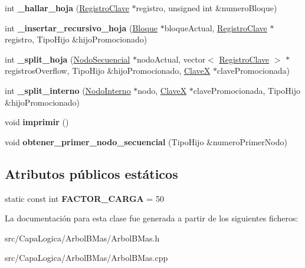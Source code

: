 \begin{DoxyCompactItemize}
\item 
\hypertarget{class_arbol_b_mas_a3786f37473948ff2f2a9cf0f794a9c36}{int {\bfseries \-\_\-hallar\-\_\-hoja} (\hyperlink{class_registro_clave}{\-Registro\-Clave} $\ast$registro, unsigned int \&numero\-Bloque)}\label{class_arbol_b_mas_a3786f37473948ff2f2a9cf0f794a9c36}

\item 
\hypertarget{class_arbol_b_mas_ae0223cce2d06bfe75333fdfe1a79fd62}{int {\bfseries \-\_\-insertar\-\_\-recursivo\-\_\-hoja} (\hyperlink{class_bloque}{\-Bloque} $\ast$bloque\-Actual, \hyperlink{class_registro_clave}{\-Registro\-Clave} $\ast$registro, \-Tipo\-Hijo \&hijo\-Promocionado)}\label{class_arbol_b_mas_ae0223cce2d06bfe75333fdfe1a79fd62}

\item 
\hypertarget{class_arbol_b_mas_a9485981812487ea1a3a7ec9d3667a68b}{int {\bfseries \-\_\-split\-\_\-hoja} (\hyperlink{class_nodo_secuencial}{\-Nodo\-Secuencial} $\ast$nodo\-Actual, vector$<$ \hyperlink{class_registro_clave}{\-Registro\-Clave} $>$ $\ast$registros\-Overflow, \-Tipo\-Hijo \&hijo\-Promocionado, \hyperlink{class_clave_x}{\-Clave\-X} $\ast$clave\-Promocionada)}\label{class_arbol_b_mas_a9485981812487ea1a3a7ec9d3667a68b}

\item 
\hypertarget{class_arbol_b_mas_ac7a38c6ee0880dacf8f7c5870588b609}{int {\bfseries \-\_\-split\-\_\-interno} (\hyperlink{class_nodo_interno}{\-Nodo\-Interno} $\ast$nodo, \hyperlink{class_clave_x}{\-Clave\-X} $\ast$clave\-Promocionada, \-Tipo\-Hijo \&hijo\-Promocionado)}\label{class_arbol_b_mas_ac7a38c6ee0880dacf8f7c5870588b609}

\item 
\hypertarget{class_arbol_b_mas_af68112171ac6eae0b00500e0a63fae1f}{void {\bfseries imprimir} ()}\label{class_arbol_b_mas_af68112171ac6eae0b00500e0a63fae1f}

\item 
\hypertarget{class_arbol_b_mas_a94c707b1e3cb481cc0940a4350a091be}{void {\bfseries obtener\-\_\-primer\-\_\-nodo\-\_\-secuencial} (\-Tipo\-Hijo \&numero\-Primer\-Nodo)}\label{class_arbol_b_mas_a94c707b1e3cb481cc0940a4350a091be}

\end{DoxyCompactItemize}
\subsection*{\-Atributos públicos estáticos}
\begin{DoxyCompactItemize}
\item 
\hypertarget{class_arbol_b_mas_a7991047264e0022b346e50973df286e8}{static const int {\bfseries \-F\-A\-C\-T\-O\-R\-\_\-\-C\-A\-R\-G\-A} = 50}\label{class_arbol_b_mas_a7991047264e0022b346e50973df286e8}

\end{DoxyCompactItemize}


\-La documentación para esta clase fue generada a partir de los siguientes ficheros\-:\begin{DoxyCompactItemize}
\item 
src/\-Capa\-Logica/\-Arbol\-B\-Mas/\-Arbol\-B\-Mas.\-h\item 
src/\-Capa\-Logica/\-Arbol\-B\-Mas/\-Arbol\-B\-Mas.\-cpp\end{DoxyCompactItemize}
